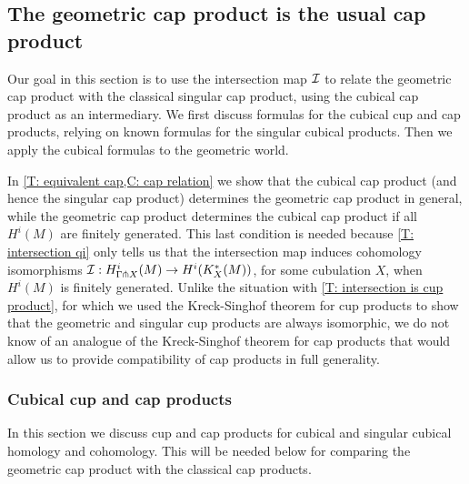 \begin{comment}
\begin{theorem}
Let $M$ and $N$ be manifolds. Then the geometric cohomology cross product $H^i_\Gamma(M) \otimes H^j_\Gamma(N) \to H^{i+j}_\Gamma(M \times N)$ is isomorphic to the singular cohomology cross product $H^i(M) \otimes H^j(N) \to H^{i+j}(M \times N)$.
\end{theorem}

\begin{proof}
NEED MORE GENERAL INTERSECTION MAP THEOREM OR TO RESTRICT TO COMPACT MANIFOLDS

\end{proof}
\end{comment}

\subsection{The geometric cap product is the usual cap product}

Our goal in this section is to use the intersection map $\mathcal{I}$ to relate the geometric cap product with the classical singular cap product, using the cubical cap product as an intermediary. We first discuss formulas for the cubical cup and cap products, relying on known formulas for the singular cubical products. Then we apply the cubical formulas to the geometric world.

In \cref{T: equivalent cap,C: cap relation} we show that the cubical cap product (and hence the singular cap product) determines the geometric cap product in general, while the geometric cap product determines the cubical cap product if all $H^i(M)$ are finitely generated. This last condition is needed because \cref{T: intersection qi} only tells us that the intersection map induces cohomology isomorphisms $\mathcal{I}: H^i_{\Gamma\pitchfork X}(M) \to H^i(K_X^*(M))$, for some cubulation $X$, when $H^i(M)$ is finitely generated. Unlike the situation with \cref{T: intersection is cup product}, for which we used the Kreck-Singhof theorem for cup products to show that the geometric and singular cup products are always isomorphic, we do not know of an analogue of the Kreck-Singhof theorem for cap products that would allow us to provide compatibility of cap products in full generality.

\subsubsection{Cubical cup and cap products}\label{S: cubical products}

In this section we discuss cup and cap products for cubical and singular cubical homology and cohomology. This will be needed below for comparing the geometric cap product with the classical cap products.

